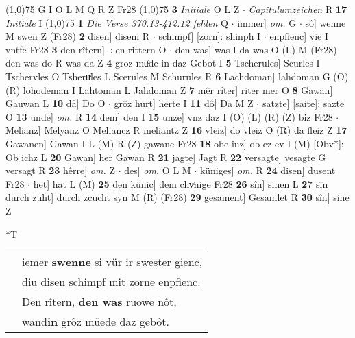 \documentclass[8pt,a4paper,notitlepage]{article}
\begin{document}
\begin{table}[ht]
\begin{minipage}[t]{0.5\linewidth}
\begin{tabular}{rl}
\end{tabular}
\scriptsize
\line(1,0){75} \newline
G I O L M Q R Z Fr28 \newline
\line(1,0){75} \newline
\textbf{3} \textit{Initiale} O L Z   $\cdot$ \textit{Capitulumzeichen} R  \textbf{17} \textit{Initiale} I  \newline
\line(1,0){75} \newline
\textbf{1} \textit{Die Verse 370.13-412.12 fehlen} Q   $\cdot$ immer] \textit{om.} G  $\cdot$ sô] wenne M swen Z (Fr28) \textbf{2} disen] disem R  $\cdot$ schimpf] [zorn]: shinph I  $\cdot$ enpfienc] vie I vntfe Fr28 \textbf{3} den rîtern] ÷en rittern O  $\cdot$ den was] was I da was O (L) M (Fr28) den was do R was da Z \textbf{4} groz muͤde in daz Gebot I \textbf{5} Tscherules] Scurles I Tschervles O Tsheruͯles L Scerules M Schurules R \textbf{6} Lachdoman] lahdoman G (O) (R) lohodeman I Lahtoman L Jahdoman Z \textbf{7} mêr rîter] riter mer O \textbf{8} Gawan] Gauwan L \textbf{10} dâ] Do O  $\cdot$ grôz hurt] herte I \textbf{11} dô] Da M Z  $\cdot$ satzte] [saite]: sazte O \textbf{13} unde] \textit{om.} R \textbf{14} dem] den I \textbf{15} unze] vnz daz I (O) (L) (R) (Z) biz Fr28  $\cdot$ Melianz] Melyanz O Meliancz R meliantz Z \textbf{16} vleiz] do vleiz O (R) da fleiz Z \textbf{17} Gawanen] Gawan I L (M) R (Z) gawane Fr28 \textbf{18} obe iuz] ob ez ev I (M) [Obv*]: Ob ichz  L \textbf{20} Gawan] her Gawan R \textbf{21} jagte] Jagt R \textbf{22} versagte] vesagte G versagt R \textbf{23} hêrre] \textit{om.} Z  $\cdot$ des] \textit{om.} O L M  $\cdot$ küniges] \textit{om.} R \textbf{24} disen] dusent Fr28  $\cdot$ het] hat L (M) \textbf{25} den künic] dem chvͦnige Fr28 \textbf{26} sîn] sinen L \textbf{27} sîn durch zuht] durch zcucht syn M (R) (Fr28) \textbf{29} gesament] Gesamlet R \textbf{30} sîn] sine Z \newline
\end{minipage}
\hspace{0.5cm}
\begin{minipage}[t]{0.5\linewidth}
\small
\begin{center}*T
\end{center}
\begin{tabular}{rl}
 & iemer \textbf{swenne} si vür ir swester gienc,\\ 
 & diu disen schimpf mit zorne enpfienc.\\ 
 & Den rîtern, \textbf{den was} ruowe nôt,\\ 
 & wand\textbf{in} grôz müede daz gebôt.\\ 

\end{tabular}
\end{minipage}
\end{table}
\end{document}
